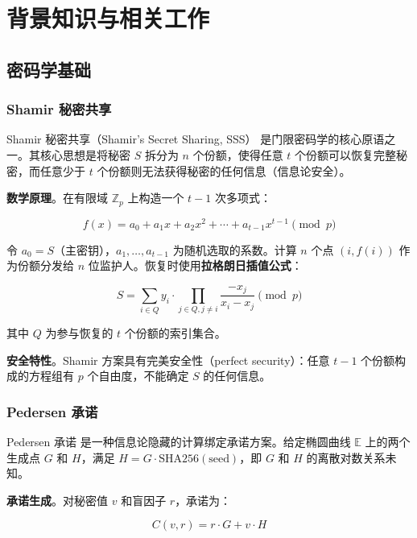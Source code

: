 \section{背景知识与相关工作}

\subsection{密码学基础}

\subsubsection{Shamir 秘密共享}

Shamir 秘密共享（Shamir's Secret Sharing, SSS）\cite{shamir1979share} 是门限密码学的核心原语之一。其核心思想是将秘密 $S$ 拆分为 $n$ 个份额，使得任意 $t$ 个份额可以恢复完整秘密，而任意少于 $t$ 个份额则无法获得秘密的任何信息（信息论安全）。

\vspace{0.5em}
\noindent \textbf{数学原理}。在有限域 $\mathbb{Z}_p$ 上构造一个 $t-1$ 次多项式：

\[
f(x) = a_0 + a_1 x + a_2 x^2 + \cdots + a_{t-1} x^{t-1} \pmod{p}
\]

令 $a_0 = S$（主密钥），$a_1, \ldots, a_{t-1}$ 为随机选取的系数。计算 $n$ 个点 $(i, f(i))$ 作为份额分发给 $n$ 位监护人。恢复时使用\textbf{拉格朗日插值公式}：

\[
S = \sum_{i \in Q} y_i \cdot \prod_{j \in Q, j \neq i} \frac{-x_j}{x_i - x_j} \pmod{p}
\]

其中 $Q$ 为参与恢复的 $t$ 个份额的索引集合。

\vspace{0.5em}
\noindent \textbf{安全特性}。Shamir 方案具有完美安全性（perfect security）：任意 $t-1$ 个份额构成的方程组有 $p$ 个自由度，不能确定 $S$ 的任何信息。

\subsubsection{Pedersen 承诺}

Pedersen 承诺 \cite{pedersen1991non} 是一种信息论隐藏的计算绑定承诺方案。给定椭圆曲线 $\mathbb{E}$ 上的两个生成点 $G$ 和 $H$，满足 $H = G \cdot \text{SHA256}(\text{seed})$，即 $G$ 和 $H$ 的离散对数关系未知。

\vspace{0.5em}
\noindent \textbf{承诺生成}。对秘密值 $v$ 和盲因子 $r$，承诺为：

\[
C(v, r) = r \cdot G + v \cdot H
\]

